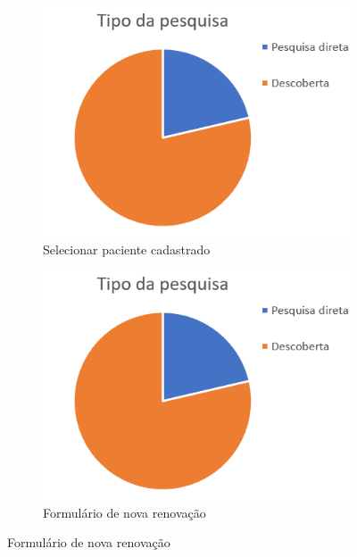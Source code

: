 \begin{figure}[H]
     \centering
     \caption{Telas de Nova renovação}
     \begin{subfigure}[t]{0.40\textwidth}
         \centering
        \includegraphics[width=\textwidth]{imagens/grafico.png}
         \caption{Selecionar paciente cadastrado}%
         \label{fig:a}
     \end{subfigure} %
     \begin{subfigure}[t]{0.40\textwidth}
         \centering
         \includegraphics[width=\textwidth]{imagens/grafico.png}
         \caption{Formulário de nova renovação}%
         \label{fig:b}
     \end{subfigure}
     
    \label{fig:13}
\end{figure}

